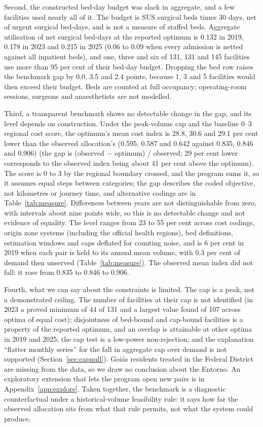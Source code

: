 Second, the constructed bed-day budget was slack in aggregate, and a few facilities used nearly all of it. The budget is SUS surgical beds times 30 days, net of urgent surgical bed-days, and is not a measure of staffed beds. Aggregate utilisation of net surgical bed-days at the reported optimum is 0.132 in 2019,
0.178 in 2023 and 0.215 in 2025 (0.06 to 0.09 when every admission is netted against all inpatient beds), and one, three and six of 131, 131 and 145 facilities use
more than 95 per cent of their bed-day budget. Dropping the bed row raises the benchmark gap by 0.0, 3.5 and 2.4 points, because 1, 3 and 5 facilities would then exceed their budget.
Beds are counted at full occupancy; operating-room sessions, surgeons and anaesthetists are not modelled.

Third, a transparent benchmark shows no detectable change in the gap, and its level depends on construction. Under the peak-volume cap and the baseline 0--3 regional cost score, the optimum's mean cost index is 28.8, 30.6 and 29.1 per cent lower than the observed
allocation's (0.595, 0.587 and 0.642 against 0.835, 0.846 and 0.906) (the gap is (observed $-$ optimum) / observed; 29 per cent lower corresponds to the observed index being about 41 per cent above the optimum). The score is 0 to 3 by the regional boundary crossed, and the program sums it, so it assumes equal steps between categories; the gap describes the coded objective, not kilometres or journey time, and alternative codings are in Table~\ref{tab:measure}. Differences between years are not distinguishable from zero, with
intervals about nine points wide, so this is no detectable change and not evidence of equality. The level ranges from 23 to 55 per cent across cost codings, origin zone systems (including the official health regions), bed definitions, estimation windows
and caps deflated for counting noise, and is 6 per cent in 2019 when each pair is held to its annual mean volume, with 0.3 per cent of demand then unserved (Table~\ref{tab:measure}). The observed mean index did not fall: it rose from 0.835 to 0.846 to 0.906.

Fourth, what we can say about the constraints is limited. The cap is a peak, not a demonstrated ceiling. The number of facilities at their cap is not identified (in 2023 a proved minimum of 44 of 131 and a largest value found of 107 across optima of equal cost);
disjointness of bed-bound and cap-bound facilities is a property of the reported optimum, and an overlap is attainable at other optima in 2019 and 2025; the cap test is a low-power non-rejection; and the explanation ``flatter monthly series'' for the fall in aggregate cap over demand is not supported (Section~\ref{sec:capnull}).
Goi\'as residents treated in the Federal District are missing from the data, so we draw no conclusion about the Entorno. An exploratory extension that lets the program open new pairs is in Appendix~\ref{app:explore}. Taken together, the benchmark is a diagnostic counterfactual under a historical-volume feasibility rule: it says how far the observed allocation sits from what that rule permits, not what the system could produce.

